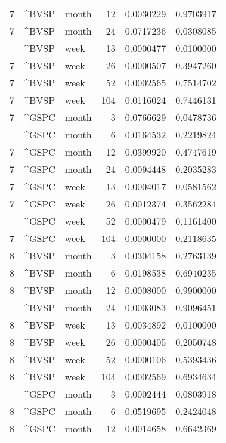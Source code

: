 \begin{tabular}{rllrrr}
7 & \textasciicircum{}BVSP & month & 12 & 0.0030229 & 0.9703917\\
7 & \textasciicircum{}BVSP & month & 24 & 0.0717236 & 0.0308085\\
\addlinespace
7 & \textasciicircum{}BVSP & week & 13 & 0.0000477 & 0.0100000\\
7 & \textasciicircum{}BVSP & week & 26 & 0.0000507 & 0.3947260\\
7 & \textasciicircum{}BVSP & week & 52 & 0.0002565 & 0.7514702\\
7 & \textasciicircum{}BVSP & week & 104 & 0.0116024 & 0.7446131\\
7 & \textasciicircum{}GSPC & month & 3 & 0.0766629 & 0.0478736\\
\addlinespace
7 & \textasciicircum{}GSPC & month & 6 & 0.0164532 & 0.2219824\\
7 & \textasciicircum{}GSPC & month & 12 & 0.0399920 & 0.4747619\\
7 & \textasciicircum{}GSPC & month & 24 & 0.0094448 & 0.2035283\\
7 & \textasciicircum{}GSPC & week & 13 & 0.0004017 & 0.0581562\\
7 & \textasciicircum{}GSPC & week & 26 & 0.0012374 & 0.3562284\\
\addlinespace
7 & \textasciicircum{}GSPC & week & 52 & 0.0000479 & 0.1161400\\
7 & \textasciicircum{}GSPC & week & 104 & 0.0000000 & 0.2118635\\
8 & \textasciicircum{}BVSP & month & 3 & 0.0304158 & 0.2763139\\
8 & \textasciicircum{}BVSP & month & 6 & 0.0198538 & 0.6940235\\
8 & \textasciicircum{}BVSP & month & 12 & 0.0008000 & 0.9900000\\
\addlinespace
8 & \textasciicircum{}BVSP & month & 24 & 0.0003083 & 0.9096451\\
8 & \textasciicircum{}BVSP & week & 13 & 0.0034892 & 0.0100000\\
8 & \textasciicircum{}BVSP & week & 26 & 0.0000405 & 0.2050748\\
8 & \textasciicircum{}BVSP & week & 52 & 0.0000106 & 0.5393436\\
8 & \textasciicircum{}BVSP & week & 104 & 0.0002569 & 0.6934634\\
\addlinespace
8 & \textasciicircum{}GSPC & month & 3 & 0.0002444 & 0.0803918\\
8 & \textasciicircum{}GSPC & month & 6 & 0.0519695 & 0.2424048\\
8 & \textasciicircum{}GSPC & month & 12 & 0.0014658 & 0.6642369\\

\end{tabular}
